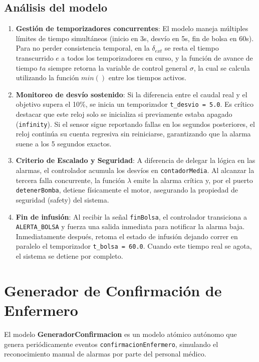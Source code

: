 \documentclass[12pt, a4paper]{article}
\begin{document}
\subsection*{Análisis del modelo}

\begin{enumerate}
    \item \textbf{Gestión de temporizadores concurrentes}: El modelo maneja múltiples límites de tiempo simultáneos (inicio en 3s, desvío en 5s, fin de bolsa en 60s). Para no perder consistencia temporal, en la $\delta_{\mathit{ext}}$ se resta el tiempo transcurrido $e$ a todos los temporizadores en curso, y la función de avance de tiempo $ta$ siempre retorna la variable de control general $\sigma$, la cual se calcula utilizando la función $min()$ entre los tiempos activos.
    
    \item \textbf{Monitoreo de desvío sostenido}: Si la diferencia entre el caudal real y el objetivo supera el 10\%, se inicia un temporizador \texttt{t\_desvio = 5.0}. Es crítico destacar que este reloj solo se inicializa si previamente estaba apagado (\texttt{infinity}). Si el sensor sigue reportando fallas en los segundos posteriores, el reloj continúa su cuenta regresiva sin reiniciarse, garantizando que la alarma suene a los 5 segundos exactos.
    
    \item \textbf{Criterio de Escalado y Seguridad}: A diferencia de delegar la lógica en las alarmas, el controlador acumula los desvíos en \texttt{contadorMedia}. Al alcanzar la tercera falla concurrente, la función $\lambda$ emite la alarma crítica y, por el puerto \texttt{detenerBomba}, detiene físicamente el motor, asegurando la propiedad de seguridad (safety) del sistema.
    
    \item \textbf{Fin de infusión}: Al recibir la señal \texttt{finBolsa}, el controlador transiciona a \texttt{ALERTA\_BOLSA} y fuerza una salida inmediata para notificar la alarma baja. Inmediatamente después, retoma el estado de infusión dejando correr en paralelo el temporizador \texttt{t\_bolsa = 60.0}. Cuando este tiempo real se agota, el sistema se detiene por completo.
\end{enumerate}
\section{Generador de Confirmación de Enfermero}

El modelo \textbf{GeneradorConfirmacion} es un modelo atómico autónomo que genera
periódicamente eventos \texttt{confirmacionEnfermero}, simulando el reconocimiento
manual de alarmas por parte del personal médico.
\end{document}
